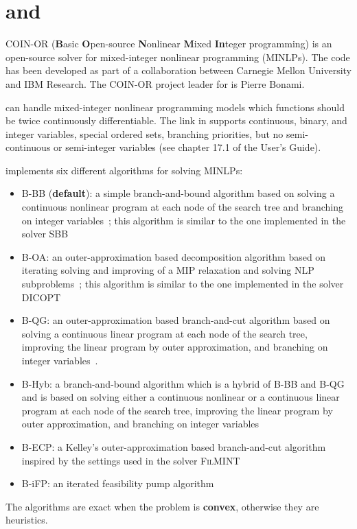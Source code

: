\chapter{\BONMIN and \BONMINH}


COIN-OR \BONMIN (\textbf{B}asic \textbf{O}pen-source \textbf{N}onlinear \textbf{M}ixed \textbf{In}teger programming) is an open-source solver for mixed-integer nonlinear programming (MINLPs).
The code has been developed as part of a collaboration between Carnegie Mellon University and IBM Research.
The COIN-OR project leader for \BONMIN is Pierre Bonami.

\BONMIN can handle mixed-integer nonlinear programming models which functions should be twice continuously differentiable.
The \BONMIN link in \GAMS supports continuous, binary, and integer variables, special ordered sets, branching priorities, but no semi-continuous or semi-integer variables (see chapter 17.1 of the \GAMS User's Guide).


\BONMIN implements six different algorithms for solving MINLPs:
\begin{itemize}
\setlength{\partopsep}{0pt}
\setlength{\itemsep}{0pt}
\item {B-BB} (\textbf{default}): a simple branch-and-bound algorithm based on solving a continuous nonlinear program at each node of the search tree and branching on integer variables~\cite{GuptaRavindran85}; this algorithm is similar to the one implemented in the solver \textsc{SBB}
\item {B-OA}: an outer-approximation based decomposition algorithm based on iterating solving and improving of a MIP relaxation and solving NLP subproblems~\cite{DuGr86,FlLe94}; this algorithm is similar to the one implemented in the solver \textsc{DICOPT}
\item {B-QG}: an outer-approximation based branch-and-cut algorithm based on solving a continuous linear program at each node of the search tree, improving the linear program by outer approximation, and branching on integer variables~\cite{QeGr92}.
\item {B-Hyb}: a branch-and-bound algorithm which is a hybrid of B-BB and B-QG and is based on solving either a continuous nonlinear or a continuous linear program at each node of the search tree, improving the linear program by outer approximation, and branching on integer variables~\cite{BBCCGLLLMSW}
\item {B-ECP}: a Kelley's outer-approximation based branch-and-cut algorithm inspired by the settings used in the solver \textsc{FilMINT}~\cite{AbLeLi07}
\item {B-iFP}: an iterated feasibility pump algorithm~\cite{BoCoLoMa06}
\end{itemize}
The algorithms are exact when the problem is \textbf{convex}, otherwise they are heuristics.

